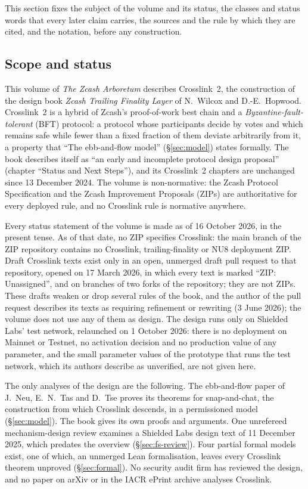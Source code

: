 \documentclass[11pt,a4paper]{article}
\theoremstyle{definition}
\begin{document}
This section fixes the subject of the volume and its status, the classes and
status words that every later claim carries, the sources and the rule by which
they are cited, and the notation, before any construction.

\subsection{Scope and status}\label{sec:intro-scope}

This volume of \emph{The Zcash Arboretum} describes Crosslink~2, the
construction of the design book \emph{Zcash Trailing Finality Layer} of
N.~Wilcox and D.-E.~Hopwood. Crosslink~2 is a hybrid of Zcash's proof-of-work
best chain and a \emph{Byzantine-fault-tolerant} (BFT) protocol: a protocol
whose participants decide by votes and which remains safe while fewer than a
fixed fraction of them deviate arbitrarily from it, a property that ``The
ebb-and-flow model'' (\S\ref{sec:model}) states formally. The book describes
itself as ``an early and incomplete protocol design proposal'' (chapter
``Status and Next Steps''), and its Crosslink~2 chapters are unchanged since
13 December 2024. The volume is non-normative: the Zcash Protocol
Specification and the Zcash Improvement Proposals (ZIPs) are authoritative
for every deployed rule, and no Crosslink rule is normative anywhere.

Every status statement of the volume is made as of 16 October 2026, in the
present tense. As of that date, no ZIP specifies Crosslink: the main branch
of the ZIP repository contains no Crosslink, trailing-finality or NU8
deployment ZIP. Draft Crosslink texts exist only in an open, unmerged draft
pull request to that repository, opened on 17 March 2026, in which every text
is marked ``ZIP: Unassigned'', and on branches of two forks of the
repository; they are not ZIPs. These drafts weaken or drop several rules of the
book, and the author of the pull request describes its texts as requiring
refinement or rewriting (3 June 2026); the volume does not use any of them as
design. The design runs only on
Shielded Labs' test network, relaunched on 1 October 2026: there is no
deployment on Mainnet or Testnet, no activation decision and no production
value of any parameter, and the small parameter values of the prototype that
runs the test network, which its authors describe as unverified, are not
given here.

The only analyses of the design are the following. The ebb-and-flow paper of
J.~Neu, E.~N.~Tas and D.~Tse proves its theorems for snap-and-chat, the
construction from which Crosslink descends, in a permissioned model
(\S\ref{sec:model}). The book gives its own proofs and arguments. One
unrefereed mechanism-design review examines a Shielded Labs design text of
11 December 2025, which predates the overview (\S\ref{sec:fs-review}). Four
partial formal models exist, one of which, an unmerged Lean formalisation,
leaves every Crosslink theorem unproved (\S\ref{sec:formal}). No security audit
firm has reviewed the design, and no paper on arXiv or in the IACR ePrint
archive analyses Crosslink.
\end{document}
